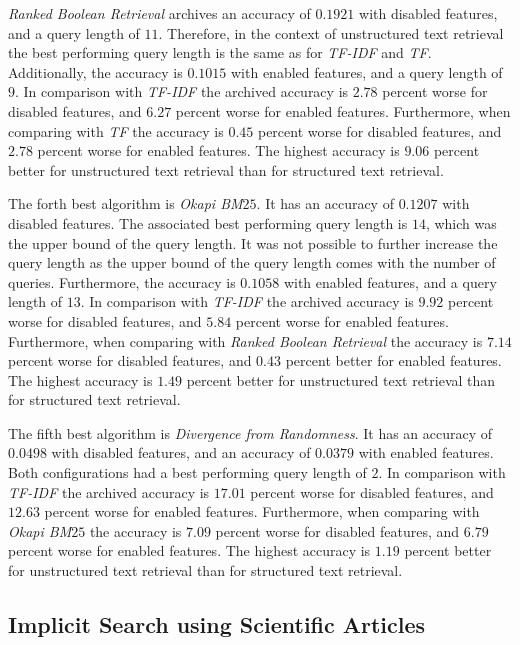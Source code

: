 \textit{Ranked Boolean Retrieval} archives an accuracy of $0.1921$ with disabled features, and a query length of $11$. Therefore, in the context of unstructured text retrieval the best performing query length is the same as for \textit{TF-IDF} and \textit{TF}. Additionally, the accuracy is $0.1015$ with enabled features, and a query length of $9$. In comparison with \textit{TF-IDF} the archived accuracy is $2.78$ percent worse for disabled features, and $6.27$ percent worse for enabled features. Furthermore, when comparing with \textit{TF} the accuracy is $0.45$ percent worse for disabled features, and $2.78$ percent worse for enabled features. The highest accuracy is $9.06$ percent better for unstructured text retrieval than for structured text retrieval.

The forth best algorithm is \textit{Okapi BM$25$}. It has an accuracy of $0.1207$ with disabled features. The associated best performing query length is $14$, which was the upper bound of the query length. It was not possible to further increase the query length as the upper bound of the query length comes with the number of queries. Furthermore, the accuracy is $0.1058$ with enabled features, and a query length of $13$. In comparison with \textit{TF-IDF} the archived accuracy is $9.92$ percent worse for disabled features, and $5.84$ percent worse for enabled features. Furthermore, when comparing with \textit{Ranked Boolean Retrieval} the accuracy is $7.14$ percent worse for disabled features, and $0.43$ percent better for enabled features. The highest accuracy is $1.49$ percent better for unstructured text retrieval than for structured text retrieval.

The fifth best algorithm is \textit{Divergence from Randomness}. It has an accuracy of $0.0498$ with disabled features, and an accuracy of $0.0379$ with enabled features. Both configurations had a best performing query length of $2$. In comparison with \textit{TF-IDF} the archived accuracy is $17.01$ percent worse for disabled features, and $12.63$ percent worse for enabled features. Furthermore, when comparing with \textit{Okapi BM$25$} the accuracy is $7.09$ percent worse for disabled features, and $6.79$ percent worse for enabled features. The highest accuracy is $1.19$ percent better for unstructured text retrieval than for structured text retrieval.

\subsection{Implicit Search using Scientific Articles}
\label{sec:implicit_search_results}

